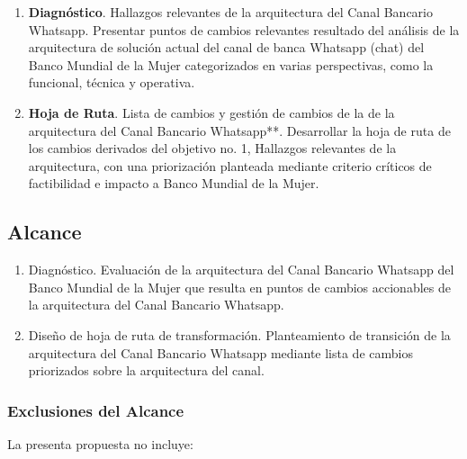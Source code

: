 \documentclass[
  paper=a4,
  ,captions=tableheading
]{scrartcl}
\providecommand{\tightlist}{%
  \setlength{\itemsep}{0pt}\setlength{\parskip}{0pt}}
\renewenvironment{quote}{\begin{customblockquote}\list{}{\rightmargin=0em\leftmargin=0em}%
\item\relax\color{blockquote-text}\ignorespaces}{\unskip\unskip\endlist\end{customblockquote}}
\begin{document}
\begin{quote}
\end{quote}

\begin{enumerate}
\def\labelenumi{\arabic{enumi}.}
\tightlist
\item
  \textbf{Diagnóstico}. Hallazgos relevantes de la arquitectura del
  Canal Bancario Whatsapp. Presentar puntos de cambios relevantes
  resultado del análisis de la arquitectura de solución actual del canal
  de banca Whatsapp (chat) del Banco Mundial de la Mujer categorizados
  en varias perspectivas, como la funcional, técnica y operativa.
\item
  \textbf{Hoja de Ruta}. Lista de cambios y gestión de cambios de la de
  la arquitectura del Canal Bancario Whatsapp**. Desarrollar la hoja de
  ruta de los cambios derivados del objetivo no. 1, Hallazgos relevantes
  de la arquitectura, con una priorización planteada mediante criterio
  críticos de factibilidad e impacto a Banco Mundial de la Mujer.
\end{enumerate}

\subsection{Alcance}\label{sec:alcance}

\begin{quote}
\end{quote}

\begin{enumerate}
\def\labelenumi{\arabic{enumi}.}
\tightlist
\item
  Diagnóstico. Evaluación de la arquitectura del Canal Bancario Whatsapp
  del Banco Mundial de la Mujer que resulta en puntos de cambios
  accionables de la arquitectura del Canal Bancario Whatsapp.
\item
  Diseño de hoja de ruta de transformación. Planteamiento de transición
  de la arquitectura del Canal Bancario Whatsapp mediante lista de
  cambios priorizados sobre la arquitectura del canal.
\end{enumerate}

\subsubsection{Exclusiones del
Alcance}\label{sec:exclusiones-del-alcance}

La presenta propuesta no incluye:
\end{document}
